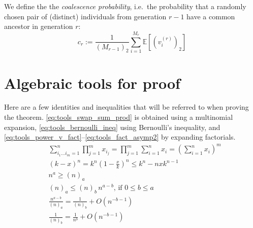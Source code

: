 \documentclass{article}
\newcommand{\E}{\mathbb{E}}
\begin{document}
We define the the \emph{coalescence probability}, i.e.\ the probability that a randomly chosen pair of (distinct) individuals from generation $r-1$ have a common ancestor in generation $r$:
\begin{equation}
c_r := \frac{1}{(M_{r-1})_2} \sum_{i=1}^{M_r} \E \left[ (v_i^{(r)})_2 \right] \label{eq:coal_prob1}
\end{equation}

\section*{Algebraic tools for proof}
Here are a few identities and inequalities that will be referred to when proving the theorem. \eqref{eq:tools_swap_sum_prod} is obtained using a multinomial expansion, \eqref{eq:tools_bernoulli_ineq} using Bernoulli's inequality, and \eqref{eq:tools_power_v_fact}--\eqref{eq:tools_fact_asymp2} by expanding factorials. 
\begin{align}
& \sum_{i_1\dots i_m = 1}^n \prod_{j=1}^m x_{i_j} = \prod_{j=1}^m \sum_{i=1}^n x_i = \left( \sum_{i=1}^n x_i \right)^m \label{eq:tools_swap_sum_prod}\\
& (k-x)^n = k^n\left(1-\frac{x}{k}\right)^n \leq k^n - nxk^{n-1} \label{eq:tools_bernoulli_ineq}\\
& n^a \geq (n)_a \label{eq:tools_power_v_fact}\\
& (n)_a \leq (n)_b \,n^{a-b} \text{, if } 0\leq b\leq a \label{eq:tools_fact_taketwo_bd}\\
& \frac{n^{a-b}}{(n)_a} = \frac{1}{(n)_b} + O(n^{-b-1}) \label{eq:tools_fact_asymp1}\\
& \frac{1}{(n)_b} = \frac{1}{n^b} + O(n^{-b-1}) \label{eq:tools_fact_asymp2}
\end{align}
\end{document}
